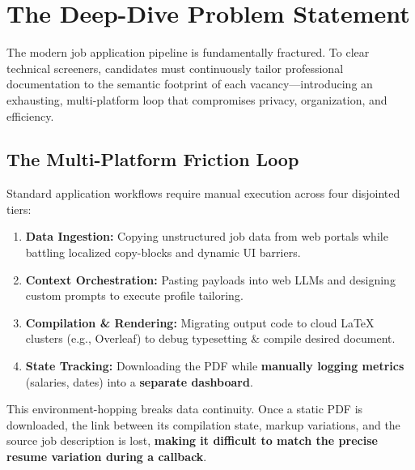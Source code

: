 \documentclass[10pt,a4paper]{article}
\begin{document}
\vspace*{2cm}



\section{The Deep-Dive Problem Statement}
The modern job application pipeline is fundamentally fractured. To clear technical screeners, candidates must continuously tailor professional documentation to the semantic footprint of each vacancy—introducing an exhausting, multi-platform loop that compromises privacy, organization, and efficiency.

\subsection{The Multi-Platform Friction Loop}
Standard application workflows require manual execution across four disjointed tiers:
\begin{enumerate}
    \item \textbf{Data Ingestion:} Copying unstructured job data from web portals while battling localized copy-blocks and dynamic UI barriers.
    \item \textbf{Context Orchestration:} Pasting payloads into web LLMs and designing custom prompts to execute profile tailoring.
    \item \textbf{Compilation \& Rendering:} Migrating output code to cloud \LaTeX{} clusters (e.g., Overleaf) to debug typesetting \& compile desired document.
    \item \textbf{State Tracking:} Downloading the PDF while \textbf{manually logging metrics} (salaries, dates) into a \textbf{separate dashboard}.
\end{enumerate}
This environment-hopping breaks data continuity. Once a static PDF is downloaded, the link between its compilation state, markup variations, and the source job description is lost, \textbf{making it difficult to match the precise resume variation during a callback}.
\end{document}
